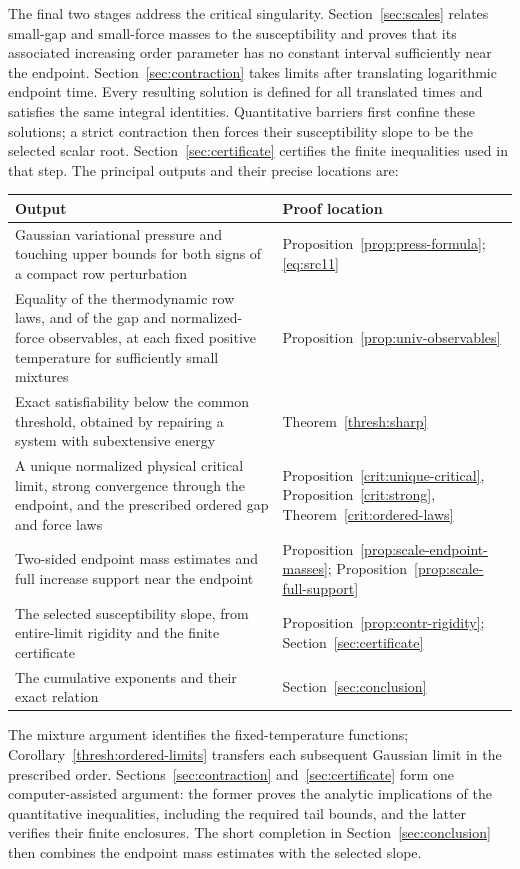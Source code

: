 \documentclass[11pt,a4paper]{article}
\numberwithin{equation}{section}
\theoremstyle{definition}
\theoremstyle{remark}
\begin{document}
The final two stages address the critical singularity.  Section~\ref{sec:scales}
relates small-gap and small-force masses to the susceptibility and proves
that its associated increasing order parameter has no constant interval
sufficiently near the endpoint.  Section~\ref{sec:contraction} takes limits after translating
logarithmic endpoint time.  Every resulting solution is defined for all
translated times and satisfies the same integral identities.  Quantitative
barriers first confine these solutions; a strict contraction then forces
their susceptibility slope to be the selected scalar root.  Section~\ref{sec:certificate}
certifies the finite inequalities used in that step.  The principal outputs
and their precise locations are:
\begin{center}
\small
\begin{tabular}{@{}p{}p{}@{}}
\toprule
Output & Proof location \\
\midrule
Gaussian variational pressure and touching upper bounds for both signs of a
compact row perturbation
& Proposition~\ref{prop:press-formula}; \eqref{eq:src11} \\
Equality of the thermodynamic row laws, and of the gap and normalized-force
observables, at each fixed positive temperature for sufficiently small mixtures
& Proposition~\ref{prop:univ-observables} \\
Exact satisfiability below the common threshold, obtained by repairing a
system with subextensive energy
& Theorem~\ref{thresh:sharp} \\
A unique normalized physical critical limit, strong convergence through the endpoint,
and the prescribed ordered gap and force laws
& Proposition~\ref{crit:unique-critical}, Proposition~\ref{crit:strong},
Theorem~\ref{crit:ordered-laws} \\
Two-sided endpoint mass estimates and full increase support near the endpoint
& Proposition~\ref{prop:scale-endpoint-masses};
Proposition~\ref{prop:scale-full-support} \\
The selected susceptibility slope, from entire-limit rigidity and the finite
certificate
& Proposition~\ref{prop:contr-rigidity}; Section~\ref{sec:certificate} \\
The cumulative exponents and their exact relation
& Section~\ref{sec:conclusion} \\
\bottomrule
\end{tabular}
\end{center}

The mixture argument identifies the fixed-temperature functions;
Corollary~\ref{thresh:ordered-limits} transfers each subsequent Gaussian
limit in the prescribed order. Sections~\ref{sec:contraction}
and~\ref{sec:certificate} form one computer-assisted argument: the former
proves the analytic implications of the quantitative inequalities,
including the required tail bounds, and the latter verifies their finite
enclosures. The short completion in Section~\ref{sec:conclusion} then
combines the endpoint mass estimates with the selected slope.
\end{document}
